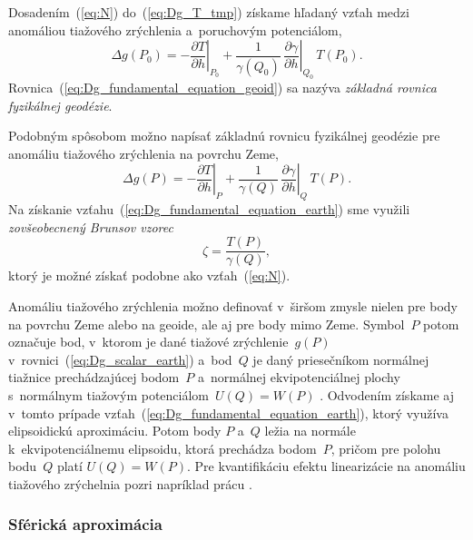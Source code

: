 \documentclass[a4paper,12pt]{book}
\begin{document}
Dosadením~(\ref{eq:N}) do~(\ref{eq:Dg_T_tmp}) získame hľadaný vzťah medzi 
anomáliou tiažového zrýchlenia a~poruchovým potenciálom,
%
\begin{equation}
\label{eq:Dg_fundamental_equation_geoid}
\Delta g(P_0) = -\left.\frac{\partial T}{\partial h}\right|_{P_0} 
+ \frac{1}{\gamma(Q_0)} \, \left.\frac{\partial \gamma}{\partial 
h}\right|_{Q_0} \, T(P_0){.}
\end{equation}
%
Rovnica~(\ref{eq:Dg_fundamental_equation_geoid}) sa nazýva \emph{základná 
rovnica fyzikálnej geodézie}.

Podobným spôsobom možno napísať základnú rovnicu fyzikálnej geodézie pre 
anomáliu tiažového zrýchlenia na povrchu Zeme,
%
\begin{equation}
\label{eq:Dg_fundamental_equation_earth}
\Delta g(P) = -\left.\frac{\partial T}{\partial h}\right|_{P} 
+ \frac{1}{\gamma(Q)} \, \left.\frac{\partial \gamma}{\partial h}\right|_{Q} \, 
T(P){.}
\end{equation}
%
Na získanie vzťahu~(\ref{eq:Dg_fundamental_equation_earth}) sme využili 
\emph{zovšeobecnený Brunsov vzorec}
%
\begin{equation}
\label{eq:zeta}
\zeta = \frac{T(P)}{\gamma(Q)}{,}
\end{equation}
%
ktorý je možné získať podobne ako vzťah~(\ref{eq:N}).

Anomáliu tiažového zrýchlenia možno definovať v~širšom zmysle nielen pre body 
na povrchu Zeme alebo na geoide, ale aj pre body mimo Zeme.  Symbol~$P$ potom 
označuje bod, v~ktorom je dané tiažové zrýchlenie~$g(P)$ 
v~rovnici~(\ref{eq:Dg_scalar_earth}) a~bod~$Q$ je daný priesečníkom normálnej 
tiažnice prechádzajúcej bodom~$P$ a~normálnej ekvipotenciálnej plochy 
s~normálnym tiažovým potenciálom~$U(Q) = W(P)$ 
\parencite{MoritzPhysicalGeodesy}.  Odvodením získame aj v~tomto prípade 
vzťah~(\ref{eq:Dg_fundamental_equation_earth}), ktorý využíva elipsoidickú 
aproximáciu.  Potom body $P$ a~$Q$ ležia na normále k~ekvipotenciálnemu 
elipsoidu, ktorá prechádza bodom~$P$, pričom pre polohu bodu~$Q$ platí $U(Q) 
= W(P)$.  Pre kvantifikáciu efektu linearizácie na anomáliu tiažového 
zrýchelnia pozri napríklad prácu \textcite{Claessens2006}.

\subsubsection{Sférická aproximácia}
\end{document}
